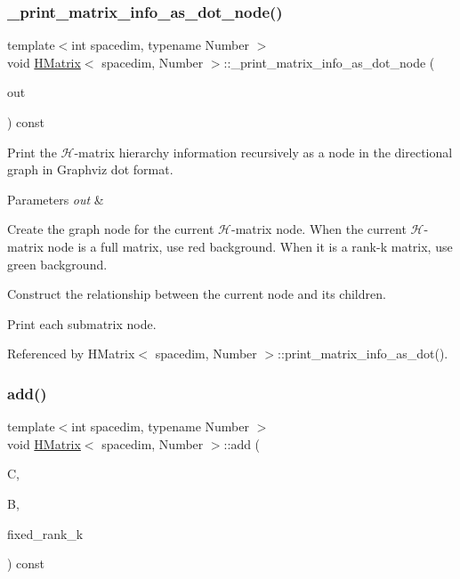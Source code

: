 \subsubsection{\texorpdfstring{\+\_\+print\+\_\+matrix\+\_\+info\+\_\+as\+\_\+dot\+\_\+node()}{\_print\_matrix\_info\_as\_dot\_node()}}
{\footnotesize\ttfamily template$<$int spacedim, typename Number $>$ \\
void \hyperlink{classHMatrix}{H\+Matrix}$<$ spacedim, Number $>$\+::\+\_\+print\+\_\+matrix\+\_\+info\+\_\+as\+\_\+dot\+\_\+node (\begin{DoxyParamCaption}\item[{std\+::ostream \&}]{out }\end{DoxyParamCaption}) const\hspace{0.3cm}{\ttfamily [private]}}

Print the $\mathcal{H}$-\/matrix hierarchy information recursively as a node in the directional graph in Graphviz dot format.


\begin{DoxyParams}{Parameters}
{\em out} & \\
\hline
\end{DoxyParams}
Create the graph node for the current $\mathcal{H}$-\/matrix node. When the current $\mathcal{H}$-\/matrix node is a full matrix, use red background. When it is a rank-\/k matrix, use green background.

Construct the relationship between the current node and its children.

Print each submatrix node.

Referenced by H\+Matrix$<$ spacedim, Number $>$\+::print\+\_\+matrix\+\_\+info\+\_\+as\+\_\+dot().

\mbox{\label{classHMatrix_a8f96186426cd3147d5af32ca84ad25ea}} 
\subsubsection{\texorpdfstring{add()}{add()}\hspace{0.1cm}{\footnotesize\ttfamily [1/10]}}
{\footnotesize\ttfamily template$<$int spacedim, typename Number $>$ \\
void \hyperlink{classHMatrix}{H\+Matrix}$<$ spacedim, Number $>$\+::add (\begin{DoxyParamCaption}\item[{\hyperlink{classHMatrix}{H\+Matrix}$<$ spacedim, Number $>$ \&}]{C,  }\item[{const \hyperlink{classHMatrix}{H\+Matrix}$<$ spacedim, Number $>$ \&}]{B,  }\item[{const \hyperlink{classHMatrix_a5ca8dc549783d38371a01ecd621ecb34}{size\+\_\+type}}]{fixed\+\_\+rank\+\_\+k }\end{DoxyParamCaption}) const}

